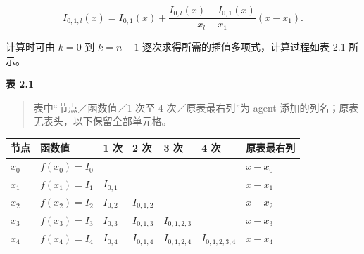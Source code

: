 \documentclass[
  10pt,
  fontset=fandol]{ctexart}
\newcounter{none} %
\begin{document}
\[
I_{0,1,l}(x)=I_{0,1}(x)
+\frac{I_{0,l}(x)-I_{0,1}(x)}{x_l-x_1}(x-x_1).
\]

计算时可由 \(k=0\) 到 \(k=n-1\) 逐次求得所需的插值多项式，计算过程如表 2.1 所示。

\textbf{表 2.1}

\begin{quote}
表中``节点／函数值／1 次至 4 次／原表最右列''为 agent 添加的列名；原表无表头，以下保留全部单元格。
\end{quote}

{\def\LTcaptype{none} %
\begin{longtable}[]{@{}
  >{\raggedright\arraybackslash}p{}
  >{\raggedright\arraybackslash}p{}
  >{\raggedright\arraybackslash}p{}
  >{\raggedright\arraybackslash}p{}
  >{\raggedright\arraybackslash}p{}
  >{\raggedright\arraybackslash}p{}
  >{\raggedright\arraybackslash}p{}@{}}
\toprule\noalign{}
\begin{minipage}[b]{\linewidth}\raggedright
节点
\end{minipage} & \begin{minipage}[b]{\linewidth}\raggedright
函数值
\end{minipage} & \begin{minipage}[b]{\linewidth}\raggedright
1 次
\end{minipage} & \begin{minipage}[b]{\linewidth}\raggedright
2 次
\end{minipage} & \begin{minipage}[b]{\linewidth}\raggedright
3 次
\end{minipage} & \begin{minipage}[b]{\linewidth}\raggedright
4 次
\end{minipage} & \begin{minipage}[b]{\linewidth}\raggedright
原表最右列
\end{minipage} \\
\midrule\noalign{}
\endhead
\bottomrule\noalign{}
\endlastfoot
\(x_0\) & \(f(x_0)=I_0\) & & & & & \(x-x_0\) \\
\(x_1\) & \(f(x_1)=I_1\) & \(I_{0,1}\) & & & & \(x-x_1\) \\
\(x_2\) & \(f(x_2)=I_2\) & \(I_{0,2}\) & \(I_{0,1,2}\) & & & \(x-x_2\) \\
\(x_3\) & \(f(x_3)=I_3\) & \(I_{0,3}\) & \(I_{0,1,3}\) & \(I_{0,1,2,3}\) & & \(x-x_3\) \\
\(x_4\) & \(f(x_4)=I_4\) & \(I_{0,4}\) & \(I_{0,1,4}\) & \(I_{0,1,2,4}\) & \(I_{0,1,2,3,4}\) & \(x-x_4\) \\
\end{longtable}
}
\end{document}
